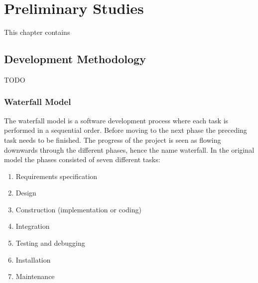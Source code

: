 
\chapter{Preliminary Studies} %

\label{Preliminary Studies} %


This chapter contains

\section{Development Methodology}

TODO

\subsection{Waterfall Model}

The waterfall model is a software development process where each task is performed in a sequential order.
Before moving to the next phase the preceding task needs to be finished.
The progress of the project is seen as flowing downwards through the different phases, hence the name waterfall.
In the original model the phases consisted of seven different tasks:


\begin{enumerate}
\item Requirements specification
\item Design
\item Construction (implementation or coding)
\item Integration
\item Testing and debugging
\item Installation
\item Maintenance
\end{enumerate}

